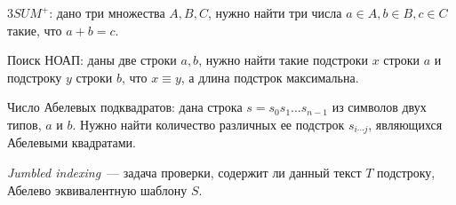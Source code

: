 \begin{problem}
$3SUM^+$: дано три множества $A, B, C$, нужно найти три числа $a \in A, b \in B, c \in C$ такие, что $a+b=c$.
\end{problem}

\begin{problem}
Поиск НОАП: даны две строки $a, b$, нужно найти такие подстроки $x$ строки $a$ и подстроку $y$ строки $b$, что $x \equiv y$, а длина подстрок максимальна.
\end{problem}

\begin{problem}
Число Абелевых подквадратов: дана строка $s=s_0s_1 \ldots s_{n-1}$ из символов двух типов, $a$ и $b$. Нужно найти количество различных ее подстрок $s_{i \cdots j}$, являющихся Абелевыми квадратами.
\end{problem}

\begin{problem}
\textit{Jumbled indexing}~--- задача проверки, содержит ли данный текст $T$ подстроку, Абелево эквивалентную шаблону $S$.
\end{problem}





